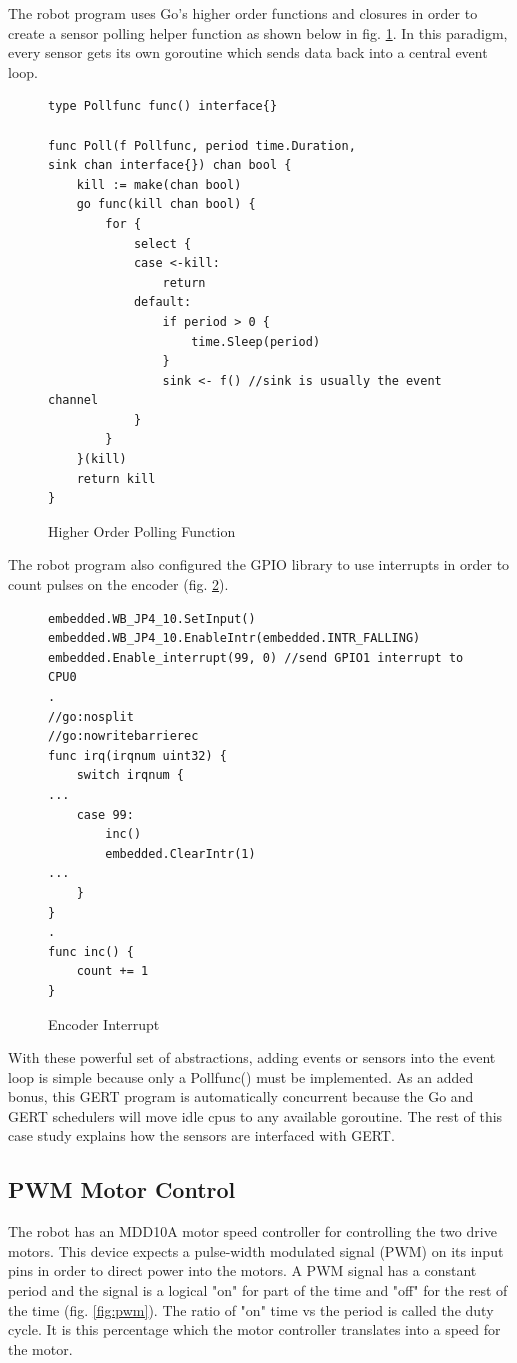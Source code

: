 The robot program uses Go's higher order functions and closures in order to create a sensor polling helper function
as shown below in fig. \ref{fig:poll_func}. In this paradigm, every sensor gets its own goroutine which sends
data back into a central event loop.


\begin{figure}[!h]
\begin{center}
\begin{lstlisting}
type Pollfunc func() interface{}

func Poll(f Pollfunc, period time.Duration,
sink chan interface{}) chan bool {
	kill := make(chan bool)
	go func(kill chan bool) {
		for {
			select {
			case <-kill:
				return
			default:
				if period > 0 {
					time.Sleep(period)
				}
				sink <- f() //sink is usually the event channel
			}
		}
	}(kill)
	return kill
}
\end{lstlisting}
\end{center}
  \caption{Higher Order Polling Function} \label{fig:poll_func}
\end{figure}

The robot program also configured the GPIO library to use interrupts in order to count pulses on the encoder (fig. \ref{fig:encoder}).

\begin{figure}[!h]
\begin{center}
\begin{lstlisting}
embedded.WB_JP4_10.SetInput()
embedded.WB_JP4_10.EnableIntr(embedded.INTR_FALLING)
embedded.Enable_interrupt(99, 0) //send GPIO1 interrupt to CPU0
.
//go:nosplit
//go:nowritebarrierec
func irq(irqnum uint32) {
	switch irqnum {
...
	case 99:
		inc()
		embedded.ClearIntr(1)
...
	}
}
.
func inc() {
	count += 1
}

\end{lstlisting}
\end{center}
  \caption{Encoder Interrupt} \label{fig:encoder}
\end{figure}

With these powerful set of abstractions, adding events or sensors into the event loop
is simple because only a Pollfunc() must be implemented. As an added bonus, this
GERT program is automatically concurrent because the Go and GERT schedulers will
move idle cpus to any available goroutine. The rest of this case study explains how the sensors
are interfaced with GERT.


\subsection{PWM Motor Control}
The robot has an MDD10A motor speed controller for controlling the two drive motors. This device
expects a pulse-width modulated signal (PWM) on its input pins in order to direct power into the
motors. A PWM signal has a constant period and the signal is a logical "on" for part of the time
and "off" for the rest of the time (fig. \ref{fig:pwm}). The ratio of "on" time vs the period is called the duty cycle.
It is this percentage which the motor controller translates into a speed for the motor.

